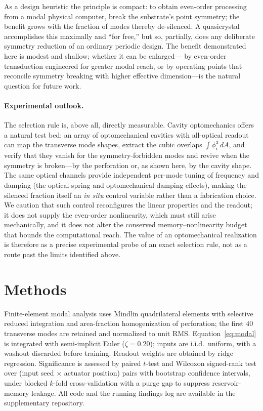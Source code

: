 \documentclass[aps,prapplied,reprint,amsmath,amssymb,floatfix]{revtex4-2}
\begin{document}
As a design heuristic the principle is compact: to obtain even-order
processing from a modal physical computer, break the substrate's point
symmetry; the benefit grows with the fraction of modes thereby de-silenced. A
quasicrystal accomplishes this maximally and ``for free,'' but so, partially,
does any deliberate symmetry reduction of an ordinary periodic design. The
benefit demonstrated here is modest and shallow; whether it can be enlarged---
by even-order transduction engineered for greater modal reach, or by operating
points that reconcile symmetry breaking with higher effective dimension---is
the natural question for future work.

\paragraph{Experimental outlook.}
The selection rule is, above all, directly measurable. Cavity optomechanics
offers a natural test bed: an array of optomechanical cavities with all-optical
readout can map the transverse mode shapes, extract the cubic overlaps
$\int\phi_i^3\,dA$, and verify that they vanish for the symmetry-forbidden
modes and revive when the symmetry is broken---by the perforation or, as shown
here, by the cavity shape. The same optical channels provide independent
per-mode tuning of frequency and damping (the optical-spring and
optomechanical-damping effects), making the silenced fraction itself an
\emph{in situ} control variable rather than a fabrication choice. We caution
that such control reconfigures the linear properties and the readout; it does
not supply the even-order nonlinearity, which must still arise mechanically,
and it does not alter the conserved memory--nonlinearity budget~\cite{dambre2012}
that bounds the computational reach. The value of an optomechanical realization is therefore
as a precise experimental probe of an exact selection rule, not as a route past
the limits identified above.

\section*{Methods}
Finite-element modal analysis uses Mindlin quadrilateral elements with
selective reduced integration and area-fraction homogenization of perforation;
the first $40$ transverse modes are retained and normalized to unit RMS.
Equation~\eqref{eq:modal} is integrated with semi-implicit Euler
($\zeta=0.20$); inputs are i.i.d.\ uniform, with a washout discarded before
training. Readout weights are obtained by ridge regression. Significance is
assessed by paired $t$-test and Wilcoxon signed-rank test over (input seed
$\times$ actuator position) pairs with bootstrap confidence intervals, under
blocked $k$-fold cross-validation with a purge gap to suppress
reservoir-memory leakage. All code and the running findings log are available
in the supplementary repository.
\end{document}
